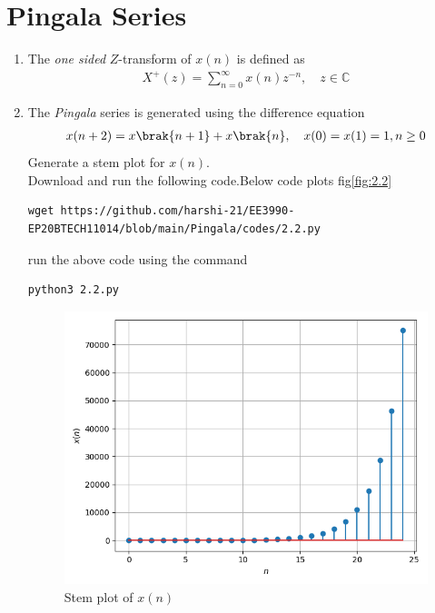 \documentclass[journal,12pt,twocolumn]{IEEEtran}
\renewcommand\thesection{\arabic{section}}
\begin{document}
\section{Pingala Series}
\begin{enumerate}[label=\thesection.\arabic*,ref=\thesection.\theenumi]
\item The {\em one sided} $Z$-transform of $x(n)$ is defined as 
\begin{align}
	X^{+}(z) = \sum_{n = 0}^{\infty}x(n)z^{-n}, \quad z \in \mathbb{C}
\label{eq:one-Z}
\end{align}
	\item The {\em Pingala} series is generated using the difference equation 
\begin{align}
	x(n+2) = x\brak{n+1} + x\brak{n},  \quad x(0) = x(1) = 1, n \ge 0
	\label{eq:10-pingala}
\end{align}
Generate a stem plot for $x(n)$.\\
\solution Download and run the following code.Below code plots fig\eqref{fig:2.2}
\begin{lstlisting}
wget https://github.com/harshi-21/EE3990-EP20BTECH11014/blob/main/Pingala/codes/2.2.py
\end{lstlisting}
run the above code using the command
\begin{lstlisting}
python3 2.2.py
\end{lstlisting}
\begin{figure}[h]
    \centering
    \includegraphics[width=\columnwidth]{./figs/2.2.png}
    \caption{Stem plot of $x(n)$}
    \label{fig:2.2}
\end{figure}

\end{enumerate}
\end{document}
